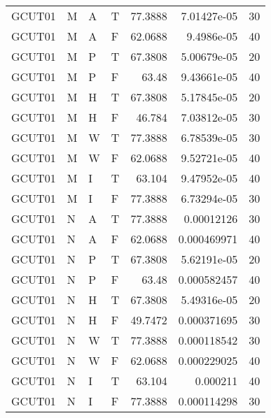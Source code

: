 \begin{tabular}{llllrrr}
    GCUT01   & M     & A     & T          & 77.3888    & 7.01427e-05 & 30       \\
    GCUT01   & M     & A     & F          & 62.0688    & 9.4986e-05  & 40       \\
    GCUT01   & M     & P     & T          & 67.3808    & 5.00679e-05 & 20       \\
    GCUT01   & M     & P     & F          & 63.48      & 9.43661e-05 & 40       \\
    GCUT01   & M     & H     & T          & 67.3808    & 5.17845e-05 & 20       \\
    GCUT01   & M     & H     & F          & 46.784     & 7.03812e-05 & 30       \\
    GCUT01   & M     & W     & T          & 77.3888    & 6.78539e-05 & 30       \\
    GCUT01   & M     & W     & F          & 62.0688    & 9.52721e-05 & 40       \\
    GCUT01   & M     & I     & T          & 63.104     & 9.47952e-05 & 40       \\
    GCUT01   & M     & I     & F          & 77.3888    & 6.73294e-05 & 30       \\
    GCUT01   & N     & A     & T          & 77.3888    & 0.00012126  & 30       \\
    GCUT01   & N     & A     & F          & 62.0688    & 0.000469971 & 40       \\
    GCUT01   & N     & P     & T          & 67.3808    & 5.62191e-05 & 20       \\
    GCUT01   & N     & P     & F          & 63.48      & 0.000582457 & 40       \\
    GCUT01   & N     & H     & T          & 67.3808    & 5.49316e-05 & 20       \\
    GCUT01   & N     & H     & F          & 49.7472    & 0.000371695 & 30       \\
    GCUT01   & N     & W     & T          & 77.3888    & 0.000118542 & 30       \\
    GCUT01   & N     & W     & F          & 62.0688    & 0.000229025 & 40       \\
    GCUT01   & N     & I     & T          & 63.104     & 0.000211    & 40       \\
    GCUT01   & N     & I     & F          & 77.3888    & 0.000114298 & 30       \\
    \hline
\end{tabular}
